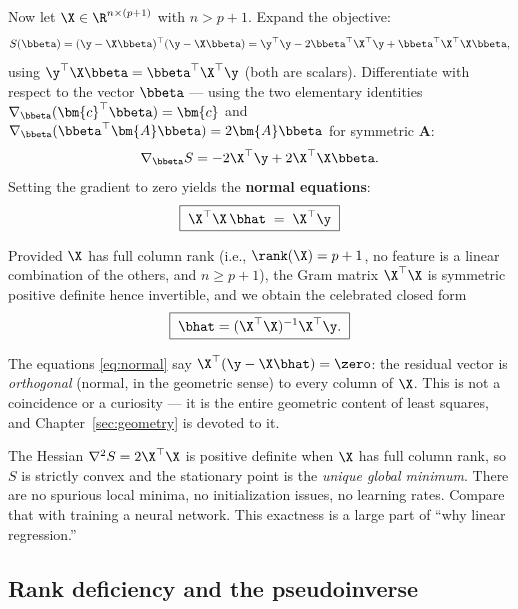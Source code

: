 Now let $\X \in \R^{n \times (p+1)}$ with $n > p+1$. Expand the objective:
\[
  S(\bbeta) = (\y - \X\bbeta)^\top (\y - \X\bbeta)
            = \y^\top \y - 2 \bbeta^\top \X^\top \y + \bbeta^\top \X^\top \X \bbeta,
\]
using $\y^\top \X \bbeta = \bbeta^\top \X^\top \y$ (both are scalars). Differentiate with respect to the vector $\bbeta$ — using the two elementary identities $\nabla_{\bbeta}(\bm{c}^\top \bbeta) = \bm{c}$ and $\nabla_{\bbeta}(\bbeta^\top \bm{A} \bbeta) = 2 \bm{A} \bbeta$ for symmetric $\bm{A}$:
\begin{equation}\label{eq:grad}
  \nabla_{\bbeta} S = -2 \X^\top \y + 2 \X^\top \X \bbeta.
\end{equation}
Setting the gradient to zero yields the \textbf{normal equations}:
\begin{equation}\label{eq:normal}
  \boxed{\;\X^\top \X \, \bhat \;=\; \X^\top \y\;}
\end{equation}

Provided $\X$ has full column rank (i.e., $\rank(\X) = p+1$, no feature is a linear combination of the others, and $n \geq p+1$), the Gram matrix $\X^\top \X$ is symmetric positive definite hence invertible, and we obtain the celebrated closed form
\begin{equation}\label{eq:ols}
  \boxed{\;\bhat = (\X^\top \X)^{-1} \X^\top \y.\;}
\end{equation}

\begin{remark}
The equations \eqref{eq:normal} say $\X^\top (\y - \X \bhat) = \zero$: the residual vector is \emph{orthogonal} (normal, in the geometric sense) to every column of $\X$. This is not a coincidence or a curiosity — it is the entire geometric content of least squares, and Chapter~\ref{sec:geometry} is devoted to it.
\end{remark}

\begin{remark}
The Hessian $\nabla^2 S = 2 \X^\top \X$ is positive definite when $\X$ has full column rank, so $S$ is strictly convex and the stationary point is the \emph{unique global minimum}. There are no spurious local minima, no initialization issues, no learning rates. Compare that with training a neural network. This exactness is a large part of ``why linear regression.''
\end{remark}

\subsection{Rank deficiency and the pseudoinverse}

